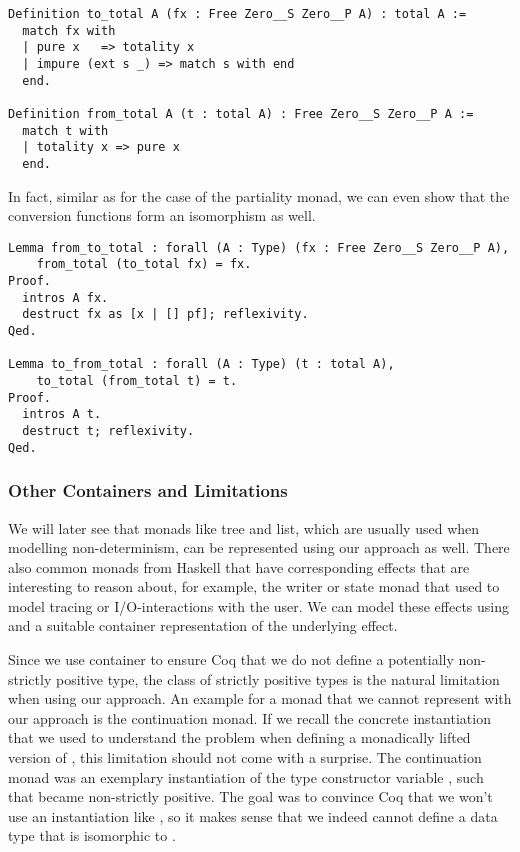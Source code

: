 \begin{verbatim}
Definition to_total A (fx : Free Zero__S Zero__P A) : total A :=
  match fx with
  | pure x   => totality x
  | impure (ext s _) => match s with end
  end.

Definition from_total A (t : total A) : Free Zero__S Zero__P A :=
  match t with
  | totality x => pure x
  end.
\end{verbatim}

\noindent
In fact, similar as for the case of the partiality monad, we can even show that the conversion functions form an isomorphism as well.

\begin{verbatim}
Lemma from_to_total : forall (A : Type) (fx : Free Zero__S Zero__P A),
    from_total (to_total fx) = fx.
Proof.
  intros A fx.
  destruct fx as [x | [] pf]; reflexivity.
Qed.

Lemma to_from_total : forall (A : Type) (t : total A),
    to_total (from_total t) = t.
Proof.
  intros A t.
  destruct t; reflexivity.
Qed.
\end{verbatim}

\subsubsection{Other Containers and Limitations}

We will later see that monads like tree and list, which are usually used when modelling non-determinism, can be represented using our approach as well.
There also common monads from Haskell that have corresponding effects that are interesting to reason about, for example, the writer or state monad that used to model tracing or I/O-interactions with the user.
We can model these effects using  and a suitable container representation of the underlying effect.

Since we use container to ensure Coq that we do not define a potentially non-strictly positive type, the class of strictly positive types is the natural limitation when using our approach.
An example for a monad that we cannot represent with our approach is the continuation monad.
If we recall the concrete instantiation that we used to understand the problem when defining a monadically lifted version of , this limitation should not come with a surprise.
The continuation monad  was an exemplary instantiation of the type constructor variable , such that  became non-strictly positive.
The goal was to convince Coq that we won't use an instantiation like , so it makes sense that we indeed cannot define a data type that is isomorphic to . 

